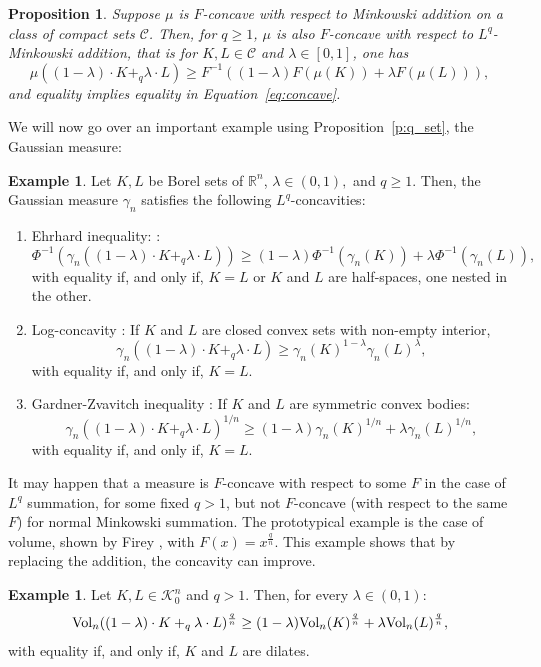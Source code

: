 \documentclass[11pt]{amsart}
\newtheorem{proposition}[theorem]{Proposition}
\theoremstyle{definition}
\newtheorem{example}[theorem]{Example}
\theoremstyle{remark}
\numberwithin{equation}{section}
\newcommand{\R}{\mathbb{R}}
\newcommand{\conbod}{\mathcal{K}^n}
\newcommand{\vol}{\text{\rm Vol}}
\begin{document}
\begin{proposition}
\label{p:qcon}
Suppose $\mu$ is $F$-concave with respect to Minkowski addition on a class of compact sets $\mathcal{C}$. Then, for $q\geq 1$, $\mu$ is also $F$-concave with respect to $L^q$-Minkowski addition, that is for $K,L\in\mathcal{C}$ and $\lambda\in[0,1]$, one has
\begin{equation}
\label{eq:fcon_q}
\mu\left((1-\lambda)\cdot K+_q\lambda \cdot L\right)\geq F^{-1}\left((1-\lambda) F(\mu(K)) +\lambda F(\mu(L))\right),
\end{equation}
and equality implies equality in Equation~\ref{eq:concave}.
\end{proposition}
\noindent We will now go over an important example using Proposition~\ref{p:q_set}, the Gaussian measure:
\begin{example}
Let $K,L$ be Borel sets of $\R^n$, $\lambda\in(0,1),$ and $q\geq 1$. Then, the Gaussian measure $\gamma_n$ satisfies the following $L^q$-concavities:
\begin{enumerate}
    \item Ehrhard inequality: \cite{Bor03,EHR1,EHR2,Lat96}:$$\Phi^{-1}\left(\gamma_{n}((1-\lambda)\cdot K+_q\lambda\cdot L)\right) \geq(1-\lambda) \Phi^{-1}\left(\gamma_{n}(K)\right)+\lambda \Phi^{-1}\left(\gamma_{n}(L)\right),$$
    with equality if, and only if, $K=L$ or $K$ and $L$ are half-spaces, one nested in the other.
    \item Log-concavity \cite{Bor75, BL76,SD77}: If $K$ and $L$ are closed convex sets with non-empty interior, $$\gamma_{n}((1-\lambda)\cdot K+_q\lambda \cdot L) \geq \gamma_{n}(K)^{1-\lambda} \gamma_{n}(L)^{\lambda},$$
    with equality if, and only if, $K=L$.
    \item Gardner-Zvavitch inequality \cite{EM21,GZ10,PT13,KL21}: If $K$ and $L$ are symmetric convex bodies: $$\gamma_n\left((1-\lambda)\cdot K +_q \lambda \cdot L\right)^{1/n}\geq (1-\lambda)\gamma_n(K)^{1/n} + \lambda \gamma_n(L)^{1/n},$$ with equality if, and only if, $K=L$.
\end{enumerate}
\end{example}
\noindent It may happen that a measure is $F$-concave with respect to some $F$ in the case of $L^q$ summation, for some fixed $q>1$, but not $F$-concave (with respect to the same $F$) for normal Minkowski summation. The prototypical example is the case of volume, shown by Firey \cite{Firey62}, with $F(x)=x^{\frac{q}{n}}$. This example shows that by replacing the addition, the concavity can improve.
\begin{example}
    Let $K,L\in\conbod_0$ and $q >1$. Then, for every $\lambda \in (0,1)$:
    $$\vol_n((1-\lambda)\cdot K +_q \lambda \cdot L)^\frac{q}{n} \geq (1-\lambda)\vol_n(K)^\frac{q}{n} + \lambda \vol_n(L)^\frac{q}{n},$$
    with equality if, and only if, $K$ and $L$ are dilates.
\end{example}
\end{document}

